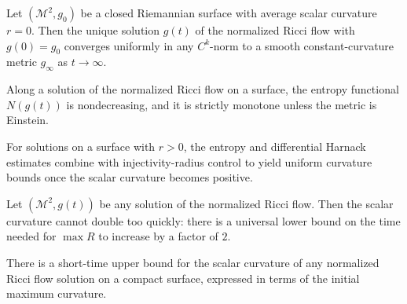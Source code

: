 \begin{theorem}
\label{ch05-thm-zero-average-curvature}

Let \((\mathcal{M}^2,g_0)\) be a closed Riemannian surface with average scalar curvature \(r=0\). Then the unique solution \(g(t)\) of the normalized Ricci flow with \(g(0)=g_0\) converges uniformly in any \(C^k\)-norm to a smooth constant-curvature metric \(g_\infty\) as \(t\to\infty\).
\end{theorem}

\begin{proposition}
\label{ch05-prop-entropy-monotonicity}

Along a solution of the normalized Ricci flow on a surface, the entropy functional \(N(g(t))\) is nondecreasing, and it is strictly monotone unless the metric is Einstein.
\end{proposition}

\begin{proposition}
\label{ch05-prop-positive-curvature-strategy}

For solutions on a surface with \(r>0\), the entropy and differential Harnack estimates combine with injectivity-radius control to yield uniform curvature bounds once the scalar curvature becomes positive.
\end{proposition}

\begin{lemma}
\label{ch05-lem-doubling-time}

Let \((\mathcal{M}^2,g(t))\) be any solution of the normalized Ricci flow. Then the scalar curvature cannot double too quickly: there is a universal lower bound on the time needed for \(\max R\) to increase by a factor of \(2\).
\end{lemma}

\begin{corollary}
\label{ch05-cor-short-time-curvature-control}

There is a short-time upper bound for the scalar curvature of any normalized Ricci flow solution on a compact surface, expressed in terms of the initial maximum curvature.
\end{corollary}

